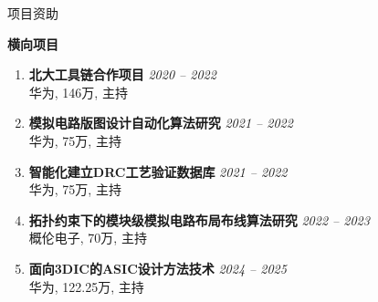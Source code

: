\begin{rSection}{项目资助}
\begin{enumerate}[font=\normalfont]
\end{enumerate}
    
\textbf{横向项目}
        
\begin{enumerate}[font=\normalfont]

\item 
{\bf 北大工具链合作项目 } \hfill{\em 2020 -- 2022} \\
华为, 146万, 主持

\item 
{\bf 模拟电路版图设计自动化算法研究 } \hfill{\em 2021 -- 2022} \\
华为, 75万, 主持

\item 
{\bf 智能化建立DRC工艺验证数据库 } \hfill{\em 2021 -- 2022} \\
华为, 75万, 主持

\item 
{\bf 拓扑约束下的模块级模拟电路布局布线算法研究 } \hfill{\em 2022 -- 2023} \\
概伦电子, 70万, 主持

\item 
{\bf 面向3DIC的ASIC设计方法技术 } \hfill{\em 2024 -- 2025} \\
华为, 122.25万, 主持

\end{enumerate}

\end{rSection}
